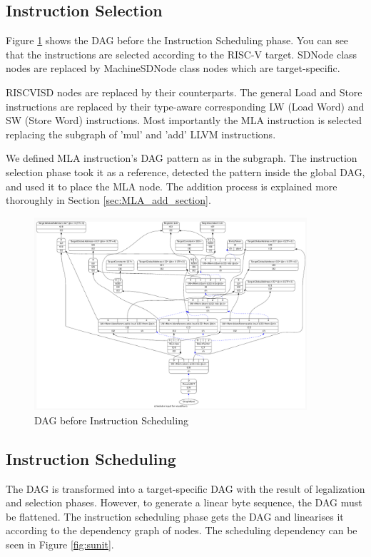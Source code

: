 \subsection{Instruction Selection}
Figure \ref{fig:dag_sched} shows the DAG before the Instruction Scheduling phase. You can see that the instructions are selected according to the RISC-V target. SDNode class nodes are replaced by MachineSDNode class nodes which are target-specific.
\par
RISCVISD nodes are replaced by their counterparts. The general Load and Store instructions are replaced by their type-aware corresponding LW (Load Word) and SW (Store Word) instructions. Most importantly the MLA instruction is selected replacing the subgraph of 'mul' and 'add' LLVM instructions. 
\par
We defined MLA instruction's DAG pattern as in the subgraph. The instruction selection phase took it as a reference, detected the pattern inside the global DAG, and used it to place the MLA node. The addition process is explained more thoroughly in Section \ref{sec:MLA_add_section}.

\begin{figure}
    \centering
    \includegraphics[width=0.9\textwidth]{path_instruction/madd_dag_sched.png}
    \caption{DAG before Instruction Scheduling}
    \label{fig:dag_sched}
\end{figure}

\subsection{Instruction Scheduling}
The DAG is transformed into a target-specific DAG with the result of legalization and selection phases. However, to generate a linear byte sequence, the DAG must be flattened. The instruction scheduling phase gets the DAG and linearises it according to the dependency graph of nodes. The scheduling dependency can be seen in Figure \ref{fig:sunit}.

